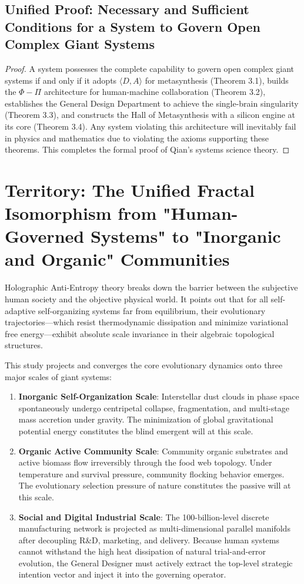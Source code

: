 \documentclass[11pt,a4paper]{article}
\begin{document}
\subsection*{Unified Proof: Necessary and Sufficient Conditions for a System to Govern Open Complex Giant Systems}
\begin{proof}
A system possesses the complete capability to govern open complex giant systems if and only if it adopts $\langle D, A \rangle$ for metasynthesis (Theorem 3.1), builds the $\Phi - \Pi$ architecture for human-machine collaboration (Theorem 3.2), establishes the General Design Department to achieve the single-brain singularity (Theorem 3.3), and constructs the Hall of Metasynthesis with a silicon engine at its core (Theorem 3.4). Any system violating this architecture will inevitably fail in physics and mathematics due to violating the axioms supporting these theorems.
This completes the formal proof of Qian's systems science theory.
\end{proof}

\section{Territory: The Unified Fractal Isomorphism from "Human-Governed Systems" to "Inorganic and Organic" Communities}

Holographic Anti-Entropy theory breaks down the barrier between the subjective human society and the objective physical world. It points out that for all self-adaptive self-organizing systems far from equilibrium, their evolutionary trajectories—which resist thermodynamic dissipation and minimize variational free energy—exhibit absolute scale invariance in their algebraic topological structures.

This study projects and converges the core evolutionary dynamics onto three major scales of giant systems:
\begin{enumerate}
    \item \textbf{Inorganic Self-Organization Scale}: Interstellar dust clouds in phase space spontaneously undergo centripetal collapse, fragmentation, and multi-stage mass accretion under gravity. The minimization of global gravitational potential energy constitutes the blind emergent will at this scale.
    \item \textbf{Organic Active Community Scale}: Community organic substrates and active biomass flow irreversibly through the food web topology. Under temperature and survival pressure, community flocking behavior emerges. The evolutionary selection pressure of nature constitutes the passive will at this scale.
    \item \textbf{Social and Digital Industrial Scale}: The 100-billion-level discrete manufacturing network is projected as multi-dimensional parallel manifolds after decoupling R&D, marketing, and delivery. Because human systems cannot withstand the high heat dissipation of natural trial-and-error evolution, the General Designer must actively extract the top-level strategic intention vector and inject it into the governing operator.
\end{enumerate}
\end{document}
